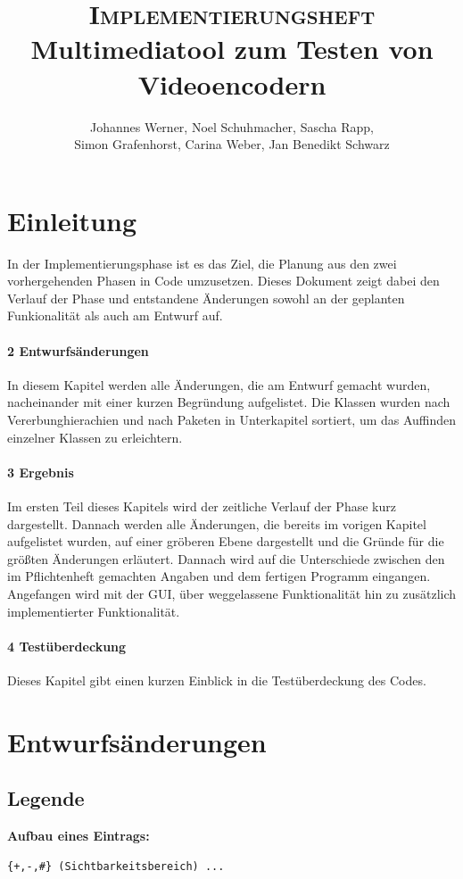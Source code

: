 \documentclass{scrartcl}
\title{\fontsize{40}{48} \selectfont \textsc{Implementierungsheft}\\
{\fontsize{18}{18} \selectfont Multimediatool zum Testen von Videoencodern}}}
\author {Johannes Werner, Noel Schuhmacher, Sascha Rapp,\\ Simon Grafenhorst,
Carina Weber, Jan Benedikt Schwarz}
\begin{document}
 {
\maketitle
\thispagestyle{empty}
\pagestyle{empty}
\newpage
\setcounter{page}{0}
\tableofcontents
\clearpage
\pagestyle{plain}
\newpage
\setcounter{page}{1}
\section{Einleitung}
In der Implementierungsphase ist es das Ziel, die Planung aus den zwei vorhergehenden Phasen in Code umzusetzen. Dieses Dokument zeigt dabei den Verlauf der Phase und entstandene Änderungen sowohl an der geplanten Funkionalität als auch am Entwurf auf.
\bigskip
\paragraph{2 Entwurfsänderungen} In diesem Kapitel werden alle Änderungen, die am Entwurf gemacht wurden, nacheinander mit einer kurzen Begründung aufgelistet. Die Klassen wurden nach Vererbunghierachien und nach Paketen in Unterkapitel sortiert, um das Auffinden einzelner Klassen zu erleichtern.
\paragraph{3 Ergebnis} Im ersten Teil dieses Kapitels wird der zeitliche Verlauf der Phase kurz dargestellt. Dannach werden alle Änderungen, die bereits im vorigen Kapitel aufgelistet wurden, auf einer gröberen Ebene dargestellt und die Gründe für die größten Änderungen erläutert. Dannach wird auf die Unterschiede zwischen den im Pflichtenheft gemachten Angaben und dem fertigen Programm eingangen. Angefangen wird mit der GUI, über weggelassene Funktionalität hin zu zusätzlich implementierter Funktionalität.
\paragraph{4 Testüberdeckung} Dieses Kapitel gibt einen kurzen Einblick in die Testüberdeckung des Codes.
\newpage
\section{Entwurfsänderungen}
\subsection{Legende}
\bigskip
\textbf{Aufbau eines Eintrags:}
\begin{verbatim}
{+,-,#} (Sichtbarkeitsbereich) ...


\end{verbatim}}
\end{document}
